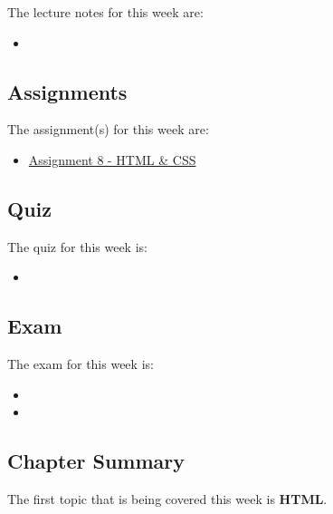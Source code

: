 \noindent The lecture notes for this week are:

\begin{itemize}
    \item {}
\end{itemize}

\subsection{Assignments}

The assignment(s) for this week are:

\begin{itemize}
    \item \href{https://github.com/cu-cspb-3308-software-dev-summer-2024/lab-8-QuantumCompiler}{Assignment 8 - HTML \& CSS}
\end{itemize}

\subsection{Quiz}

The quiz for this week is:

\begin{itemize}
    \item {}
\end{itemize}

\subsection{Exam}

The exam for this week is:

\begin{itemize}
    \item {}
    \item {}
\end{itemize}

\subsection{Chapter Summary}

The first topic that is being covered this week is \textbf{HTML}.

